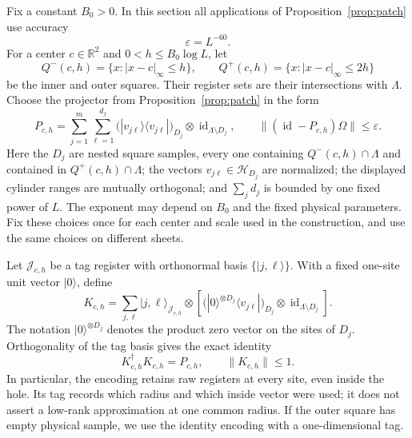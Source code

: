 \documentclass[11pt]{article}
\numberwithin{equation}{section}
\theoremstyle{definition}
\theoremstyle{remark}
\DeclareMathOperator{\id}{id}
\newcommand{\norm}[1]{\lVert #1\rVert}
\newcommand{\abs}[1]{\lvert #1\rvert}
\begin{document}
Fix a constant $B_0>0$.  In this section all applications of
Proposition~\ref{prop:patch} use accuracy
\begin{equation}\label{eq:frame-epsilon}
 \varepsilon=L^{-60}.
\end{equation}
For a center $c\in\mathbb R^2$ and $0<h\le B_0\log L$, let
\[
 Q^-(c,h)=\{x:\abs{x-c}_\infty\le h\},\qquad
 Q^+(c,h)=\{x:\abs{x-c}_\infty\le 2h\}
\]
be the inner and outer squares.  Their register sets are their intersections
with $\Lambda$.  Choose the projector from Proposition~\ref{prop:patch} in
the form
\begin{equation}\label{eq:hole-projector}
 P_{c,h}
   =\sum_{j=1}^{m}\sum_{\ell=1}^{d_j}
       \bigl(|v_{j\ell}\rangle\langle v_{j\ell}|\bigr)_{D_j}
           \otimes\id_{\Lambda\setminus D_j},
 \qquad
 \norm{(\id-P_{c,h})\Omega}\le\varepsilon.
\end{equation}
Here the $D_j$ are nested square samples, every one containing
$Q^-(c,h)\cap\Lambda$ and contained in $Q^+(c,h)\cap\Lambda$; the vectors
$v_{j\ell}\in\mathcal H_{D_j}$ are normalized; the displayed cylinder
ranges are mutually orthogonal; and $\sum_jd_j$ is bounded by one fixed
power of $L$.  The exponent may depend on $B_0$ and the fixed physical
parameters.  Fix these choices once for each center and scale used in the
construction, and use the same choices on different sheets.

Let $\mathcal J_{c,h}$ be a tag register with orthonormal basis
$\{|j,\ell\rangle\}$.  With a fixed one-site unit vector $|0\rangle$, define
\begin{equation}\label{eq:hole-encoder}
 K_{c,h}
  =\sum_{j,\ell}|j,\ell\rangle_{\mathcal J_{c,h}}\otimes
       \left[
       \bigl(|0\rangle^{\otimes D_j}\langle v_{j\ell}|\bigr)_{D_j}
           \otimes\id_{\Lambda\setminus D_j}
       \right].
\end{equation}
The notation $|0\rangle^{\otimes D_j}$ denotes the product zero vector on
the sites of $D_j$.  Orthogonality of the tag basis gives the exact identity
\begin{equation}\label{eq:encoder-contraction}
 K_{c,h}^{\dagger}K_{c,h}=P_{c,h},\qquad \norm{K_{c,h}}\le1.
\end{equation}
In particular, the encoding retains raw registers at every site, even inside
the hole.  Its tag records which radius and which inside vector were used;
it does not assert a low-rank approximation at one common radius.  If the
outer square has empty physical sample, we use the identity encoding with
a one-dimensional tag.
\end{document}
